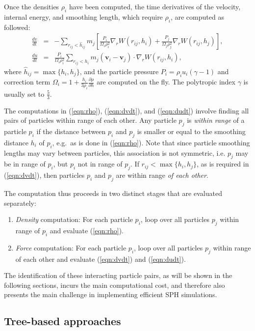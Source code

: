 \documentclass[final]{siamltex}
\newcommand{\eqn}[1]
    {(\ref{eqn:#1})}
\begin{document}
Once the densities $\rho_i$ have been computed,
the time derivatives
of the velocity, internal energy, and smoothing length, which
require $\rho_i$, are computed as followed:
%
\begin{eqnarray}
    \frac{dv}{dt} & = & -\sum_{r_{ij} < \hat{h}_{ij}} m_j \left[
        \frac{P_i}{\Omega_i\rho_i^2}\nabla_rW(r_{ij},h_i) +
        \frac{P_j}{\Omega_j\rho_j^2}\nabla_rW(r_{ij},h_j) \right], \label{eqn:dvdt} \\ 
    \frac{du}{dt} & = & \frac{P_i}{\Omega_i\rho_i^2} \sum_{r_{ij} < h_i} m_j(\mathbf v_i - \mathbf v_j) \cdot \nabla_rW(r_{ij},h_i), \label{eqn:dudt}
\end{eqnarray}
%
where $\hat{h}_{ij} = \max\{h_i,h_j\}$, and the particle pressure
$P_i=\rho_i u_i (\gamma-1)$ and correction term
$\Omega_i=1 + \frac{h_i}{3\rho_i}\frac{\partial \rho}{\partial h}$
are computed on the fly.
The polytropic index $\gamma$ is usually set to $\frac{5}{3}$.

The computations in \eqn{rho}, \eqn{dvdt}, and \eqn{dudt}
involve finding all pairs of particles
within range of each other.
Any particle $p_j$ is {\em within range} of a particle $p_i$
if the distance between $p_i$ and $p_j$ is smaller or equal
to the smoothing distance $h_i$ of $p_i$, e.g.~as is done in \eqn{rho}.
Note that since particle smoothing lengths may vary between particles,
this association is not symmetric, i.e. $p_j$ may be in range of
$p_i$, but $p_i$ not in range of $p_j$.
If $r_{ij} < \max\{h_i,h_j\}$, as is required in \eqn{dvdt},
then particles $p_i$ and $p_j$ are within range
{\em of each other}.

The computation thus proceeds in two distinct stages that are
evaluated separately:
\begin{enumerate}
    \item {\em Density} computation: For each particle $p_i$,
        loop over all particles $p_j$ within range of $p_i$ and evaluate
        \eqn{rho}.
    \item {\em Force} computation: For each particle $p_i$,
        loop over all particles $p_j$
        within range of each other and evaluate \eqn{dvdt} and \eqn{dudt}.
\end{enumerate}
The identification of these interacting particle pairs,
as will be shown in the following sections, incurs the main computational
cost, and therefore also presents the main challenge in implementing efficient
SPH simulations.


\subsection{Tree-based approaches}
\end{document}
